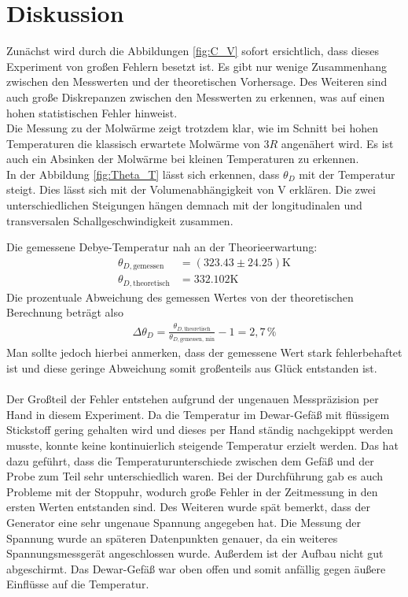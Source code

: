 \section{Diskussion}
\label{sec:Diskussion}
Zunächst wird durch die Abbildungen \ref{fig:C_V} sofort ersichtlich, dass dieses Experiment von großen Fehlern besetzt ist. 
Es gibt nur wenige Zusammenhang zwischen den Messwerten und der theoretischen Vorhersage. Des Weiteren sind 
auch große Diskrepanzen zwischen den Messwerten zu erkennen, was auf einen hohen statistischen Fehler hinweist. \\
Die Messung zu der Molwärme zeigt trotzdem klar, wie im Schnitt bei hohen Temperaturen die klassisch erwartete Molwärme von $3 R$ angenähert wird. 
Es ist auch ein Absinken der Molwärme bei kleinen Temperaturen zu erkennen.\\
 In der Abbildung \ref{fig:Theta_T} lässt sich erkennen, dass $\theta_D$ mit der Temperatur steigt. Dies lässt sich mit der Volumenabhängigkeit von V erklären. Die zwei unterschiedlichen Steigungen hängen demnach mit der longitudinalen und transversalen Schallgeschwindigkeit zusammen. 

Die gemessene Debye-Temperatur nah an der Theorieerwartung:
\begin{align*}
    \theta_{D,\text{gemessen}} &= (323.43 \pm 24.25) \si{\kelvin}\\
    \theta_{D,\text{theoretisch}} &= 332.102 \si{\kelvin}
\end{align*}
Die prozentuale Abweichung des gemessen Wertes von der theoretischen Berechnung beträgt also
\begin{align*}
    \Delta \theta_D =\frac{\theta_{D,\text{theoretisch}}}{\theta_{D,\text{gemessen, min}}} -1 =  2,7 \,\si{\%}
\end{align*}
Man sollte jedoch hierbei anmerken, dass der gemessene Wert stark fehlerbehaftet ist und diese geringe Abweichung somit großenteils aus Glück entstanden ist. \\\\
Der Großteil der Fehler entstehen aufgrund der ungenauen Messpräzision per Hand in diesem Experiment. Da die Temperatur im Dewar-Gefäß mit flüssigem Stickstoff 
gering gehalten wird und dieses per Hand ständig nachgekippt werden musste, konnte keine kontinuierlich steigende Temperatur erzielt werden. 
Das hat dazu geführt, dass die Temperaturunterschiede zwischen dem Gefäß und der Probe zum Teil sehr unterschiedlich waren. 
Bei der Durchführung gab es auch Probleme mit der Stoppuhr, wodurch große Fehler in der Zeitmessung in den ersten Werten entstanden sind. Des Weiteren wurde spät bemerkt, dass der Generator eine sehr ungenaue Spannung angegeben hat. Die Messung der Spannung wurde an späteren Datenpunkten genauer, da ein weiteres Spannungsmessgerät angeschlossen wurde.   
Außerdem ist der Aufbau nicht gut abgeschirmt. Das Dewar-Gefäß war oben offen und somit anfällig gegen äußere Einflüsse auf die Temperatur. 
